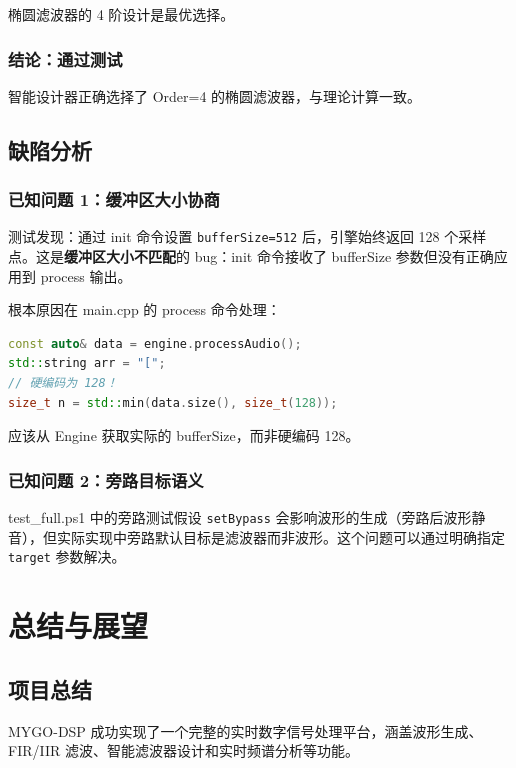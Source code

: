 ﻿\documentclass[12pt,a4paper,oneside]{ctexbook}
\begin{document}
椭圆滤波器的 4 阶设计是最优选择。

\subsection{结论：通过测试}

智能设计器正确选择了 Order=4 的椭圆滤波器，与理论计算一致。

\section{缺陷分析}

\subsection{已知问题 1：缓冲区大小协商}

测试发现：通过 init 命令设置 \texttt{bufferSize=512} 后，引擎始终返回 128 个采样点。这是\textbf{缓冲区大小不匹配}的 bug：init 命令接收了 bufferSize 参数但没有正确应用到 process 输出。

根本原因在 main.cpp 的 process 命令处理：
\begin{lstlisting}[language=C++, caption={process 输出固定为 128 个采样}]
const auto& data = engine.processAudio();
std::string arr = "[";
// 硬编码为 128！
size_t n = std::min(data.size(), size_t(128));
\end{lstlisting}

应该从 Engine 获取实际的 bufferSize，而非硬编码 128。

\subsection{已知问题 2：旁路目标语义}

test\_full.ps1 中的旁路测试假设 \texttt{setBypass} 会影响波形的生成（旁路后波形静音），但实际实现中旁路默认目标是滤波器而非波形。这个问题可以通过明确指定 \texttt{target} 参数解决。

\chapter{总结与展望}

\section{项目总结}

MYGO-DSP 成功实现了一个完整的实时数字信号处理平台，涵盖波形生成、FIR/IIR 滤波、智能滤波器设计和实时频谱分析等功能。
\end{document}
